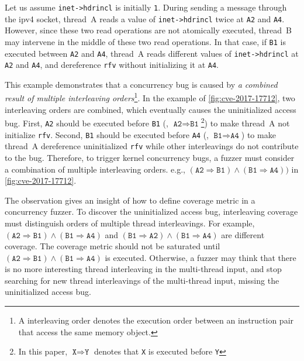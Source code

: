 Let us assume \texttt{inet->hdrincl} is initially \texttt{1}.
%
During sending a message through the ipv4 socket, thread~A reads a
value of \texttt{inet->hdrincl} twice at \texttt{A2} and \texttt{A4}.
%
However, since these two read operations are not atomically executed,
thread~B may intervene in the middle of these two read operations.
%
In that case, if \texttt{B1} is executed between \texttt{A2} and
\texttt{A4}, thread~A reads different values of \texttt{inet->hdrincl}
at \texttt{A2} and \texttt{A4}, and dereference \texttt{rfv} without
initializing it at \texttt{A4}.


%
This example demonstrates that a concurrency bug is caused by \textit{a combined
  result of multiple interleaving orders}\footnote{A interleaving order
denotes the execution order between an instruction pair that access
the same memory object.}.
%
In the example of \autoref{fig:cve-2017-17712}, two interleaving orders
are combined, which eventually causes the uninitialized access bug.
%
First, \texttt{A2} should be executed before \texttt{B1} (\ie,
$\texttt{A2} \Rightarrow \texttt{B1}$\footnote{In this paper,
  $\texttt{X} \Rightarrow \texttt{Y}$ denotes that \texttt{X} is
  executed before \texttt{Y}}) to make thread~A not initialize
\texttt{rfv}.
%
Second, \texttt{B1} should be executed before \texttt{A4} (\ie,
$\texttt{B1} \Rightarrow \texttt{A4}$) to make thread~A dereference
uninitialized \texttt{rfv} while other interleavings do not 
contribute to the bug.
%
Therefore, to trigger kernel concurrency bugs, a fuzzer must 
consider a combination of multiple interleaving orders. e.g.,
$(\texttt{A2} \Rightarrow \texttt{B1}) \wedge (\texttt{B1} \Rightarrow
\texttt{A4}))$ in \autoref{fig:cve-2017-17712}.


The observation gives an insight of how to define coverage metric 
in a concurrency fuzzer.
To discover the uninitialized access bug, 
interleaving coverage must distinguish orders of multiple thread interleavings. For example, $(\texttt{A2} \Rightarrow \texttt{B1}) \wedge (\texttt{B1} \Rightarrow
\texttt{A4})$ and $(\texttt{B1} \Rightarrow \texttt{A2}) \wedge (\texttt{B1} \Rightarrow
\texttt{A4})$ are different coverage.
The coverage metric should not be saturated until
$(\texttt{A2} \Rightarrow \texttt{B1}) \wedge (\texttt{B1} \Rightarrow
\texttt{A4})$ is executed.
%
Otherwise, a fuzzer may think that there is no more interesting thread
interleaving in the multi-thread input, and stop searching for new
thread interleavings of the multi-thread input, missing the
uninitialized access bug.


